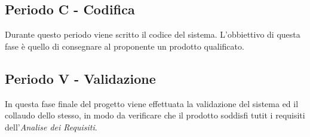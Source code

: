 \documentclass[./PianoDiProgetto.tex]{subfiles}
\begin{document}
  \subsection{Periodo C - Codifica}

  Durante questo periodo viene scritto il codice del sistema. L'obbiettivo
  di questa fase è quello di consegnare al proponente un prodotto qualificato.

  \subsection{Periodo V - Validazione}

  In questa fase finale del progetto viene effettuata la validazione del sistema ed il
  collaudo dello stesso, in modo da verificare che il prodotto soddisfi tutit i requisiti
  dell'\textit{Analise dei Requisiti}. 
\end{document}
